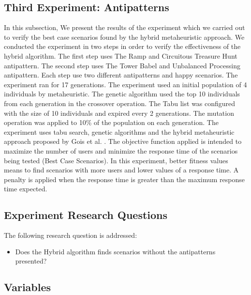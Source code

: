 \documentclass[espaco=umemeio,chapter=TITLE,twoside,openright]{abnt}
\begin{document}

\subsection{Third Experiment: Antipatterns}

In this subsection, We present the results of the experiment which we carried out to verify the best case scenarios found by the hybrid metaheuristic approach. We conducted the experiment in two steps in order to verify the effectiveness of the hybrid algorithm.  The first step uses The Ramp and Circuitous Treasure Hunt antipattern. The second step uses The Tower Babel and Unbalanced Processing antipattern. Each step use two different antipatterns and happy scenarios. The experiment ran for 17 generations. The experiment used an initial population of 4 individuals by metaheuristic. The genetic algorithm used the top 10 individuals from each generation in the crossover operation. The Tabu list was configured with the size of 10 individuals and expired every 2 generations.  The mutation operation was applied to 10\% of the population on each generation. The experiment uses tabu search, genetic algorithms and the hybrid metaheuristic approach proposed by Gois et al. \cite{Gois2016}. The objective function applied is intended to maximize the number of users and minimize the response time of the scenarios being tested (Best Case Scenarios).  In this experiment, better fitness values means to find scenarios with more users and lower values of a response time. A penalty is applied when the response time is greater than the  maximum response time expected. 

\subsection{Experiment Research Questions}

The following research question is addressed:
\begin{itemize}
\item Does the Hybrid algorithm  finds scenarios without the antipatterns presented?
\end{itemize}

\subsection{Variables}
\end{document}
